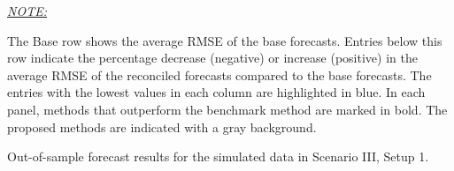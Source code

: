 \documentclass[11pt,a4paper,]{article}
\begin{document}
\begin{table}[!h]
{\begin{threeparttable}
\begin{tablenotes}[para]
\item \underline{\textit{NOTE:}} 
\item The Base row shows the average RMSE of the base forecasts. Entries below this row indicate the percentage decrease (negative) or increase (positive) in the average RMSE of the reconciled forecasts compared to the base forecasts. The entries with the lowest values in each column are highlighted in blue. In each panel, methods that outperform the benchmark method are marked in bold. The proposed methods are indicated with a gray background.
\end{tablenotes}
\end{threeparttable}}
\end{table}

\hypertarget{tbl-s3-rmse}{}
\begin{table}[!h]
\caption{\label{tbl-s3-rmse}Out-of-sample forecast results for the simulated data in Scenario III,
Setup 1. }\tabularnewline


\end{table}
\end{document}
